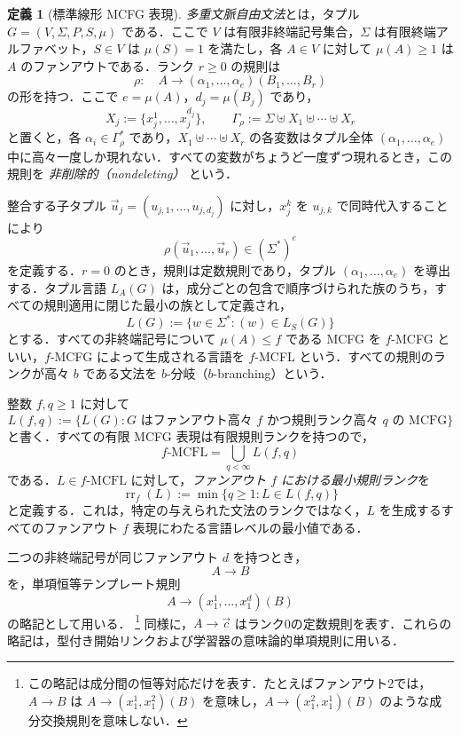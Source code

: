 \documentclass[11pt,a4paper]{ltjsarticle}
\numberwithin{equation}{section}
\theoremstyle{plain}
\theoremstyle{definition}
\newtheorem{definition}[theorem]{定義}
\theoremstyle{remark}
\newcommand{\tuple}[1]{\vec{#1}}
\begin{document}
\begin{definition}[標準線形 MCFG 表現]
\label{def:standard-mcfg}
\emph{多重文脈自由文法}とは，タプル
\(G=(V,\Sigma,P,S,\mu)\) である．ここで $V$ は有限非終端記号集合，$\Sigma$ は有限終端アルファベット，$S\in V$ は $\mu(S)=1$ を満たし，各 $A\in V$ に対して $\mu(A)\ge1$ は $A$ のファンアウトである．ランク $r\ge0$ の規則は
\[
  \rho:\quad
  A\to(\alpha_1,\ldots,\alpha_e)(B_1,\ldots,B_r)
\]
の形を持つ．ここで $e=\mu(A)$，$d_j=\mu(B_j)$ であり，
\[
  X_j:=\{x_j^1,\ldots,x_j^{d_j}\},
  \qquad
  \Gamma_\rho:=\Sigma\uplus X_1\uplus\cdots\uplus X_r
\]
と置くと，各 $\alpha_i\in\Gamma_\rho^*$ であり，$X_1\uplus\cdots\uplus X_r$ の各変数はタプル全体 $(\alpha_1,\ldots,\alpha_e)$ 中に高々一度しか現れない．すべての変数がちょうど一度ずつ現れるとき，この規則を \emph{非削除的（nondeleting）} という．

整合する子タプル $\tuple u_j=(u_{j,1},\ldots,u_{j,d_j})$ に対し，$x_j^k$ を $u_{j,k}$ で同時代入することにより
\[
  \rho(\tuple u_1,\ldots,\tuple u_r)\in(\Sigma^*)^e
\]
を定義する．$r=0$ のとき，規則は定数規則であり，タプル $(\alpha_1,\ldots,\alpha_e)$ を導出する．タプル言語 $L_A(G)$ は，成分ごとの包含で順序づけられた族のうち，すべての規則適用に閉じた最小の族として定義され，
\[
  L(G):=\{w\in\Sigma^*:(w)\in L_S(G)\}
\]
とする．すべての非終端記号について $\mu(A)\le f$ である MCFG を $f$-MCFG といい，$f$-MCFG によって生成される言語を $f$-MCFL という．すべての規則のランクが高々 $b$ である文法を $b$-分岐（$b$-branching）という．
\end{definition}

整数 $f,q\ge1$ に対して
\[
  L(f,q):=\{L(G):G\text{ はファンアウト高々 }f
  \text{ かつ規則ランク高々 }q\text{ の MCFG}\}
\]
と書く．すべての有限 MCFG 表現は有限規則ランクを持つので，
\[
f\text{-}\mathrm{MCFL}=\bigcup_{q<\infty}L(f,q)
\]
である．$L\in f\text{-}\mathrm{MCFL}$ に対して，\emph{ファンアウト $f$ における最小規則ランク}を
\[
  \operatorname{rr}_f(L)
  :=\min\{q\ge1:L\in L(f,q)\}
\]
と定義する．これは，特定の与えられた文法のランクではなく，$L$ を生成するすべてのファンアウト $f$ 表現にわたる言語レベルの最小値である．

二つの非終端記号が同じファンアウト $d$ を持つとき，
\[
  A\to B
\]
を，単項恒等テンプレート規則
\[
A\to(x_1^1,\ldots,x_1^d)(B)
\]
の略記として用いる．%
\footnote{この略記は成分間の恒等対応だけを表す．たとえばファンアウト2では，$A\to B$ は $A\to(x_1^1,x_1^2)(B)$ を意味し，$A\to(x_1^2,x_1^1)(B)$ のような成分交換規則を意味しない．}
同様に，$A\to\tuple c$ はランク0の定数規則を表す．これらの略記は，型付き開始リンクおよび学習器の意味論的単項規則に用いる．
\end{document}
